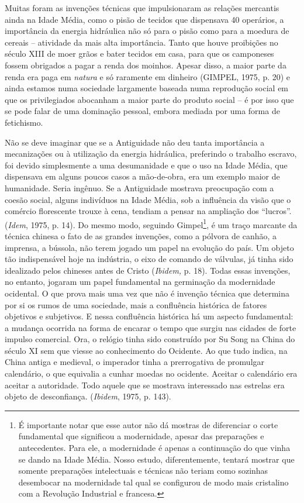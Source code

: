 Muitas foram as invenções técnicas que impulsionaram as relações
mercantis ainda na Idade Média, como o pisão de tecidos que dispensava
40 operários, a importância da energia hidráulica não só para o pisão
como para a moedura de cereais -- atividade da mais alta importância.
Tanto que houve proibições no século XIII de moer grãos e bater tecidos
em casa, para que os camponeses fossem obrigados a pagar a renda dos
moinhos. Apesar disso, a maior parte da renda era paga em \emph{natura}
e só raramente em dinheiro (GIMPEL, 1975, p. 20) e ainda estamos numa
sociedade largamente baseada numa reprodução social em que os
privilegiados abocanham a maior parte do produto social -- é por isso
que se pode falar de uma dominação pessoal, embora mediada por uma forma
de fetichismo.

Não se deve imaginar que se a Antiguidade não deu tanta importância a
mecanizações ou à utilização da energia hidráulica, preferindo o
trabalho escravo, foi devido simplesmente a uma desumanidade e que o uso
na Idade Média, que dispensava em alguns poucos casos a mão-de-obra, era
um exemplo maior de humanidade. Seria ingênuo. Se a Antiguidade mostrava
preocupação com a coesão social, alguns indivíduos na Idade Média, sob a
influência da visão que o comércio florescente trouxe à cena, tendiam a
pensar na ampliação dos ``lucros''. (\emph{Idem}, 1975, p. 14). Do mesmo
modo, seguindo Gimpel\footnote{É importante notar que esse autor não dá
  mostras de diferenciar o corte fundamental que significou a
  modernidade, apesar das preparações e antecedentes. Para ele, a
  modernidade é apenas a continuação do que vinha se dando na Idade
  Média. Nosso estudo, diferentemente, tentará mostrar que somente
  preparações intelectuais e técnicas não teriam como sozinhas
  desembocar na modernidade tal qual se configurou de modo mais
  cristalino com a Revolução Industrial e francesa.}, é um traço
marcante da técnica chinesa o fato de as grandes invenções, como a
pólvora de canhão, a imprensa, a bússola, não terem jogado um papel na
evolução do país. Um objeto tão indispensável hoje na indústria, o eixo
de comando de válvulas, já tinha sido idealizado pelos chineses antes de
Cristo (\emph{Ibidem,} p. 18). Todas essas invenções, no entanto,
jogaram um papel fundamental na germinação da modernidade ocidental. O
que prova mais uma vez que não é invenção técnica que determina por si
os rumos de uma sociedade, mais a confluência histórica de fatores
objetivos e subjetivos. E nessa confluência histórica há um aspecto
fundamental: a mudança ocorrida na forma de encarar o tempo que surgiu
nas cidades de forte impulso comercial. Ora, o relógio tinha sido
construído por Su Song na China do século XI sem que viesse ao
conhecimento do Ocidente. Ao que tudo indica, na China antiga e
medieval, o imperador tinha a prerrogativa de promulgar calendário, o
que equivalia a cunhar moedas no ocidente. Aceitar o calendário era
aceitar a autoridade. Todo aquele que se mostrava interessado nas
estrelas era objeto de desconfiança. (\emph{Ibidem}, 1975, p. 143).

